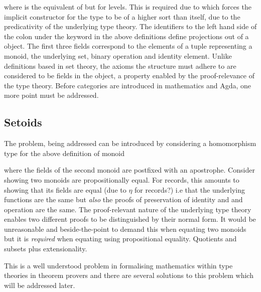 
where  is the equivalent of  but for
levels. This is required due to \AgdaField{$\bullet$} which
forces the implicit constructor for the type to be of a higher sort than
 itself, due to the predicativity of the underlying type theory.
The identifiers to the left hand side of the colon under the 
keyword in the above definitions define projections out of a
 object. The first three fields correspond to the elements
of a tuple representing a monoid, the underlying set, binary operation and
identity element. Unlike definitions based in set theory, the axioms the
structure must adhere to are considered to be fields in the object, a property
enabled by the proof-relevance of the type theory. Before categories are
introduced in mathematics and Agda, one more point must be addressed.

\subsection{Setoids}
The problem, being addressed can be introduced by considering a homomorphism
type for the above definition of monoid

\begin{AgdaMultiCode}
\end{AgdaMultiCode}

where the fields of the second monoid are postfixed with an apostrophe. Consider
showing two monoids are propositionally equal. For records, this amounts to
showing that its fields are equal (due to $\eta$ for records?) i.e that the
underlying functions are the same but \textit{also} the proofs of preservation
of identity and and operation are the same. The proof-relevant nature of the
underlying type theory enables two different proofs to be distinguished by their
normal form. It would be unreasonable and beside-the-point to demand this when
equating two monoids but it is \textit{required} when equating using
propositional equality. Quotients and subsets plus extensionality.

This is a well understood problem in formalising
mathematics within type theories in theorem provers and there are several
solutions to this problem which will be addressed later.

